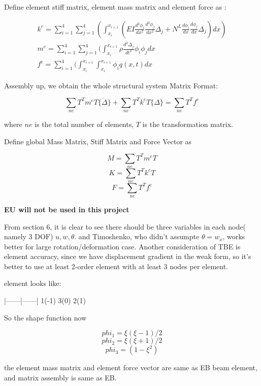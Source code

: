 \documentclass[11pt]{article}
\begin{document}
\begin{enumerate}
Define element stiff matrix, element mass matrix and element force as :

\begin{subequations}
\begin{align}
k^e = \sum_{i=1}^4 \sum_{j=1}^4 ( \int_{x_i}^{x_{i+1}}( EI \frac{d^2 \phi_i}{dx^2} \frac{d^2 \phi_j}{dx^2}\Delta_j + N^L \frac{d \phi_i}{dx} \frac{d \phi_j}{dx} \Delta_j) dx) \\
m^e =  \sum_{i=1}^4 \sum_{j=1}^4 ( \int_{x_i}^{x_{i+1}} \rho \frac{d^2 \Delta_j}{dt^2} \phi_i \phi_j dx \\
f^e =  \sum_{i=1}^4 ( \int_{x_i}^{x_{i+1}} \int_{x_i}^{x_{i+1}} \phi_i q(x,t) dx
\end{align}
\end{subequations}

Assembly up, we obtain the whole structural system Matrix Format:

$$ \sum_{ne} T^T m^e T \{ \ddot{\Delta} \} + \sum_{ne} T^T k^e T \{ \Delta \} = \sum_{ne} T^T f^e $$ 

where $ne$ is the total number of elements, $T$ is the transformation matrix.

Define global Mass Matrix, Stiff Matrix and Force Vector as

$$ M = \sum_{ne} T^T m^e T $$
$$ K = \sum_{ne} T^T k^e T $$
$$ F = \sum_{ne} T^T f^e $$ 

\textbf{EU will not be used in this project}


From section 6, it is clear to see there should be three variables in each node( namely 3 DOF) $u, w, \theta$. 
and Timoshenko, who didn't assumpte $\theta = w_x$,  works better for large rotation/deformation case.
Another consideration of TBE is element accuracy, since we have displacement gradient in the weak form, so it's better to use at least 2-order element with at least 3 nodes per element. 

element looks like:

 |------|------|
 1(-1)  3(0)   2(1)

So the shape function now

$$ phi_1 = \xi (\xi -1 )/2 $$
$$ phi_2 = \xi (\xi + 1)/2 $$
$$ phi_3 = (1 - \xi ^2) $$

 

the element mass matrix and element force vector are same as EB beam element, and matrix assembly is same as EB. 
   
\end{enumerate}
\end{document}
